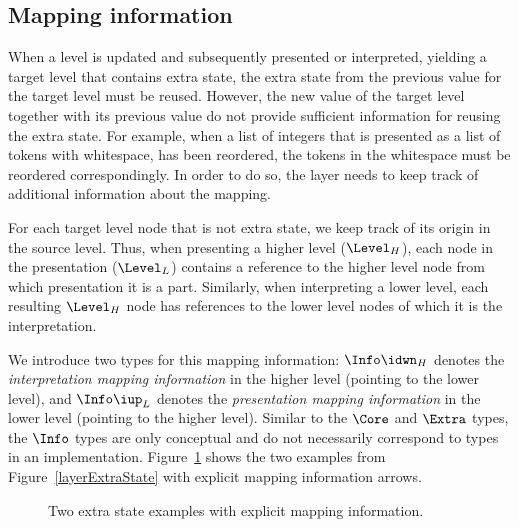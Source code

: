 %																
\subsection{Mapping information} \label{sect:mappingInformation}

When a level is updated and subsequently presented or interpreted, yielding a target level that contains extra state, the extra state from the previous value for the target level must be reused. However, the new value of the target level together with its previous value do not provide sufficient information for reusing the extra state. For example, when a list of integers that is presented as a list of tokens with whitespace, has been reordered, the tokens in the whitespace must be reordered correspondingly.  In order to do so, the layer needs to keep track of additional information about the mapping.

For each target level node that is not extra state, we keep track of its origin in the source level. Thus, when presenting a higher level ($\Level_{H}$), each node in the presentation ($\Level_{L}$) contains a reference to the higher level node from which presentation it is a part. Similarly, when interpreting a lower level, each resulting $\Level_{H}$ node has references to the lower level nodes of which it is the interpretation. 

We introduce two types for this mapping information: $\Info\idwn_{H}$ denotes the {\em interpretation mapping information} in the higher level (pointing to the lower level), and $\Info\iup_{L}$ denotes the {\em presentation mapping information} in the lower level (pointing to the higher level). Similar to the $\Core$ and $\Extra$ types, the $\Info$ types are only conceptual and do not necessarily correspond to types in an implementation. Figure~\ref{coreExtraInfoExamples} shows the two examples from Figure~\ref{layerExtraState} with explicit mapping information arrows. 

\begin{figure}
\begin{center}
\begin{center}
\end{center}
\caption{Two extra state examples with explicit mapping information.}\label{coreExtraInfoExamples} 
\end{center}
\end{figure}

